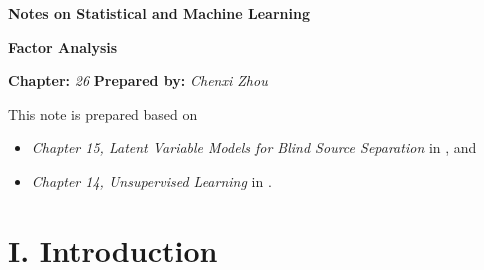 \documentclass[12pt]{article}
\newcommand{\titlebox}[4]{
\begin{tcolorbox}[colback = blue!5!white!95, colframe = blue!70!black
]
  \noindent \textbf{ #1 } \hfill \textit{#2} 
  \begin{center}
  	 \LARGE{\textbf{#3}}
  \end{center}
\textbf{Chapter:} \textit{#4} \hfill \textbf{Prepared by:} \textit{Chenxi Zhou}
\end{tcolorbox}
}
\begin{document}
\titlebox{Notes on Statistical and Machine Learning}{}{Factor Analysis}{26}
\thispagestyle{plain}

\vspace{10pt}

This note is prepared based on 
\begin{itemize}
	\item \textit{Chapter 15, Latent Variable Models for Blind Source Separation} in \textcite{Izenman2009-jk}, and 
	\item \textit{Chapter 14, Unsupervised Learning} in \textcite{Friedman2001-np}. 
\end{itemize}


\section*{I. Introduction}
\end{document}
